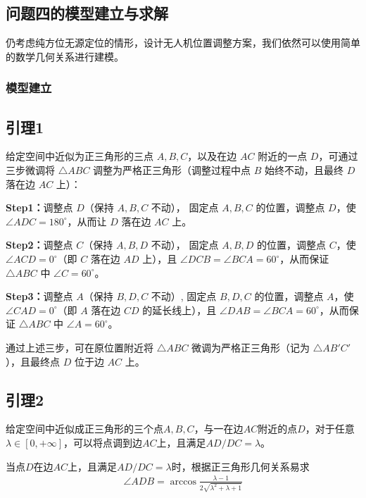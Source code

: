 \documentclass[withoutpreface,bwprint]{cumcmthesis} %
\begin{document}
\subsection{问题四的模型建立与求解}
仍考虑纯方位无源定位的情形，设计无人机位置调整方案，我们依然可以使用简单的数学几何关系进行建模。
\subsubsection{模型建立}
\subsection*{引理1}
给定空间中近似为正三角形的三点 \( A, B, C \)，以及在边 \( AC \) 附近的一点 \( D \)，可通过三步微调将 \( \triangle ABC \) 调整为严格正三角形（调整过程中点 \( B \) 始终不动，且最终 \( D \) 落在边 \( AC \) 上）：

\textbf{Step1：}调整点 \( D \)（保持 \( A, B, C \) 不动），
固定点 \( A, B, C \) 的位置，调整点 \( D \)，使 \( \angle ADC = 180^\circ \)，从而让 \( D \) 落在边 \( AC \) 上。

\textbf{Step2：}调整点 \( C \)（保持 \( A, B, D \) 不动），
固定点 \( A, B, D \) 的位置，调整点 \( C \)，使 \( \angle ACD = 0^\circ \)（即 \( C \) 落在边 \( AD \) 上），且 \( \angle DCB = \angle BCA = 60^\circ \)，从而保证 \( \triangle ABC \) 中 \( \angle C = 60^\circ \)。

\textbf{Step3：}调整点 \( A \)（保持 \( B, D, C \) 不动）,
固定点 \( B, D, C \) 的位置，调整点 \( A \)，使 \( \angle CAD = 0^\circ \)（即 \( A \) 落在边 \( CD \) 的延长线上），且 \( \angle DAB = \angle BCA = 60^\circ \)，从而保证 \( \triangle ABC \) 中 \( \angle A = 60^\circ \)。

通过上述三步，可在原位置附近将 \( \triangle ABC \) 微调为严格正三角形（记为 \( \triangle AB'C' \)），且最终点 \( D \) 位于边 \( AC \) 上。
\subsection*{引理2}
给定空间中近似成正三角形的三个点\( A,B,C \)，与一在边\( AC \)附近的点\( D \)，对于任意\( \lambda \in [0, +\infty] \)，可以将点调到边\( AC \)上，且满足\( AD/DC = \lambda \)。

当点\( D \)在边\( AC \)上，且满足\( AD/DC = \lambda \)时，根据正三角形几何关系易求
\begin{align}
    \angle ADB = \arccos \frac{\lambda - 1}{2\sqrt{\lambda^2 + \lambda + 1}}
\end{align}
\end{document}
